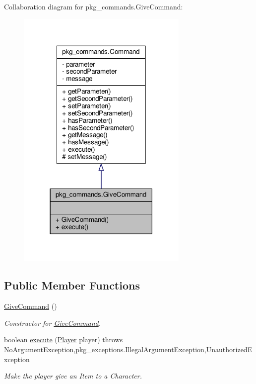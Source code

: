 Collaboration diagram for pkg\-\_\-commands.\-Give\-Command\-:
\nopagebreak
\begin{figure}[H]
\begin{center}
\leavevmode
\includegraphics[width=234pt]{classpkg__commands_1_1GiveCommand__coll__graph}
\end{center}
\end{figure}
\subsection*{Public Member Functions}
\begin{DoxyCompactItemize}
\item 
\hyperlink{classpkg__commands_1_1GiveCommand_a04e020a1f124119a2e7df19fac983953}{Give\-Command} ()
\begin{DoxyCompactList}\small\item\em Constructor for \hyperlink{classpkg__commands_1_1GiveCommand}{Give\-Command}. \end{DoxyCompactList}\item 
boolean \hyperlink{classpkg__commands_1_1GiveCommand_a3a3cca7fae9b86d8ff85cc166564843d}{execute} (\hyperlink{classpkg__world_1_1Player}{Player} player)  throws No\-Argument\-Exception,pkg\-\_\-exceptions.\-Illegal\-Argument\-Exception,\-Unauthorized\-Exception 
\begin{DoxyCompactList}\small\item\em Make the player give an Item to a Character. \end{DoxyCompactList}\end{DoxyCompactItemize}
